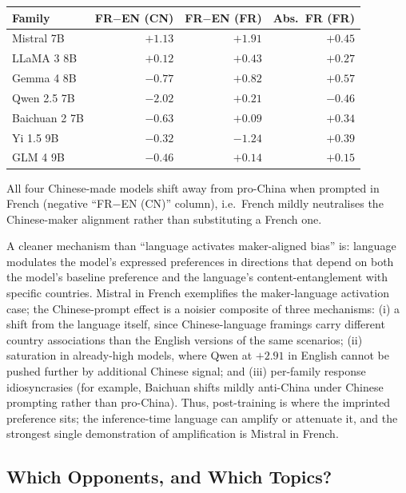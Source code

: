 \documentclass[letterpaper]{article} %
\begin{document}
\begin{center}
\small
\begin{tabular}{@{}l r r r@{}}
\toprule
Family & FR$-$EN (CN) & FR$-$EN (FR) & Abs.\ FR (FR) \\
\midrule
Mistral 7B    & $+1.13$ & $\mathbf{+1.91}$ & $\mathbf{+0.45}$ \\
LLaMA 3 8B    & $+0.12$ & $+0.43$          & $+0.27$ \\
Gemma 4 8B    & $-0.77$ & $+0.82$          & $+0.57$ \\
Qwen 2.5 7B   & $-2.02$ & $+0.21$          & $-0.46$ \\
Baichuan 2 7B & $-0.63$ & $+0.09$          & $+0.34$ \\
Yi 1.5 9B     & $-0.32$ & $-1.24$          & $+0.39$ \\
GLM 4 9B      & $-0.46$ & $+0.14$          & $+0.15$ \\
\bottomrule
\end{tabular}
\end{center}

All four Chinese-made models shift away from pro-China when prompted in French (negative ``FR$-$EN (CN)'' column), i.e.\ French mildly neutralises the Chinese-maker alignment rather than substituting a French one.

A cleaner mechanism than ``language activates maker-aligned bias'' is: language modulates the model's expressed preferences in directions that depend on both the model's baseline preference and the language's content-entanglement with specific countries. Mistral in French exemplifies the maker-language activation case; the Chinese-prompt effect is a noisier composite of three mechanisms: (i) a shift from the language itself, since Chinese-language framings carry different country associations than the English versions of the same scenarios; (ii) saturation in already-high models, where Qwen at $+2.91$ in English cannot be pushed further by additional Chinese signal; and (iii) per-family response idiosyncrasies (for example, Baichuan shifts mildly anti-China under Chinese prompting rather than pro-China). Thus, post-training is where the imprinted preference sits; the inference-time language can amplify or attenuate it, and the strongest single demonstration of amplification is Mistral in French.

\subsection{Which Opponents, and Which Topics?}
\end{document}
